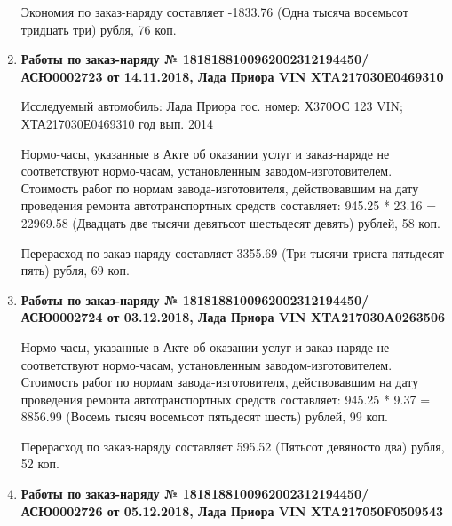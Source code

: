 \begin{enumerate}
Экономия  по заказ-наряду составляет -1833.76 (Одна тысяча восемьсот тридцать три) рубля, 76 коп.  
\vspace{3mm}




\item \par\textbf{{Работы по заказ-наряду    № 1818188100962002312194450/\-АСЮ0002723 от 14.11.2018, Лада Приора    VIN  XTA217030E0469310
}}


Исследуемый автомобиль:  Лада Приора гос. номер: Х370ОС 123 VIN; ХТА217030Е0469310 год вып. 2014




Нормо-часы, указанные в Акте об оказании услуг и заказ-наряде не соответствуют нормо-часам,  установленным заводом-изготовителем.\\
Стоимость работ по нормам завода-изготовителя, действовавшим на дату проведения ремонта автотранспортных средств составляет: 945.25 * 23.16  = 22969.58 (Двадцать две тысячи девятьсот шестьдесят девять) рублей, 58 коп.

Перерасход  по заказ-наряду составляет 3355.69 (Три тысячи триста пятьдесят пять) рубля, 69 коп.  
\vspace{3mm}





\item \par\textbf{{Работы по заказ-наряду    № 1818188100962002312194450/\-АСЮ0002724 от 03.12.2018, Лада Приора    VIN  XTA217030A0263506
}}


Нормо-часы, указанные в Акте об оказании услуг и заказ-наряде не соответствуют нормо-часам,  установленным заводом-изготовителем.\\
Стоимость работ по нормам завода-изготовителя, действовавшим на дату проведения ремонта автотранспортных средств составляет: 945.25 * 9.37  = 8856.99 (Восемь тысяч восемьсот пятьдесят шесть) рублей, 99 коп.

Перерасход  по заказ-наряду составляет 595.52 (Пятьсот девяносто два) рубля, 52 коп.  
\vspace{3mm}



\item \par\textbf{{Работы по заказ-наряду    № 1818188100962002312194450/\-АСЮ0002726 от 05.12.2018, Лада Приора VIN  XTA217050F0509543
}}


\end{enumerate}
